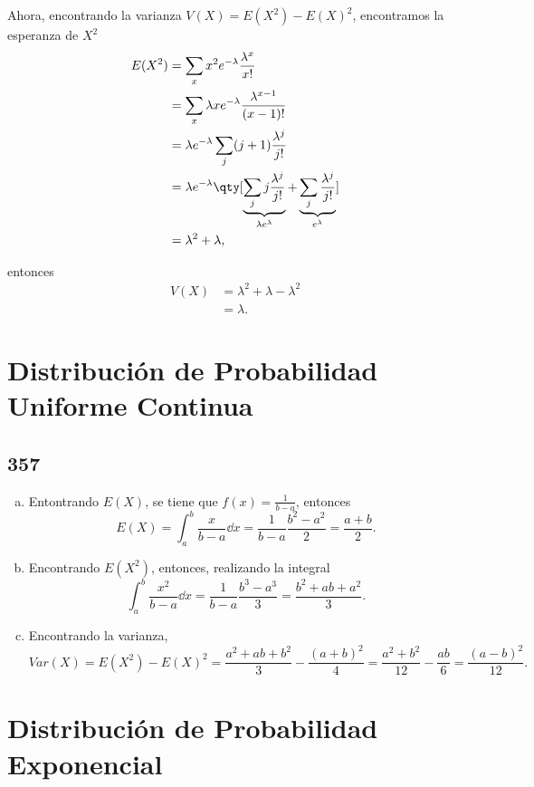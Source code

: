 Ahora, encontrando la varianza $V(X) = E(X^2) - E(X)^2$, encontramos la esperanza de $X^2$
	\begin{align*}
		E(X^2) &= \sum _x x^2 e^{-\lambda} \frac{\lambda ^x}{x!} \\
		&= \sum _x \lambda xe^{-\lambda} \frac{\lambda ^{x - 1}}{(x - 1)!} \\
		&= \lambda e^{-\lambda} \sum _j (j + 1) \frac{\lambda ^j}{j!} \\
		&= \lambda e^{-\lambda} \qty[\underbrace{\sum _j j\frac{\lambda ^j}{j!}}_{\lambda e^\lambda} + \underbrace{\sum _j \frac{\lambda ^j}{j!}}_{e^\lambda}] \\
		&= \lambda ^2 + \lambda ,
	\end{align*}

entonces
\begin{align*}
	V(X) &= \lambda ^2 + \lambda - \lambda ^2 \\
	&= \lambda .
\end{align*}



\section{Distribución de Probabilidad Uniforme Continua}
\subsection*{357}

\begin{enumerate}[a)]
	\item Entontrando $E(X)$, se tiene que $f(x) = \frac{1}{b-a}$, entonces
		$$E(X) = \int _a ^b \frac{x}{b-a} \dd{x} = \frac{1}{b-a} \frac{b^2 - a^2}{2} = \frac{a+b}{2}.$$
	\item Encontrando $E(X^2)$, entonces, realizando la integral
		$$\int _a ^b \frac{x^2}{b-a} \dd{x} = \frac{1}{b-a} \frac{b^3 - a^3}{3} = \frac{b^2 + ab + a^2}{3}.$$
	\item Encontrando la varianza,
		$$Var(X) = E(X^2) - E(X)^2 = \frac{a^2 + ab + b^2}{3} - \frac{(a + b)^2}{4} = \frac{a^2 + b^2}{12} - \frac{ab}{6} = \frac{(a - b)^2}{12}.$$
\end{enumerate}


\section{Distribución de Probabilidad Exponencial}
